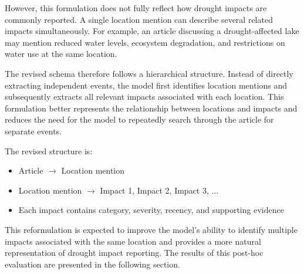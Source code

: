 However, this formulation does not fully reflect how drought impacts are commonly reported. A single location mention can describe several related impacts simultaneously. For example, an article discussing a drought-affected lake may mention reduced water levels, ecosystem degradation, and restrictions on water use at the same location.

The revised schema therefore follows a hierarchical structure. Instead of directly extracting independent events, the model first identifies location mentions and subsequently extracts all relevant impacts associated with each location. This formulation better represents the relationship between locations and impacts and reduces the need for the model to repeatedly search through the article for separate events.

The revised structure is:

\begin{itemize}
\item Article $\rightarrow$ Location mention
\item Location mention $\rightarrow$ Impact 1, Impact 2, Impact 3, ...
\item Each impact contains category, severity, recency, and supporting evidence
\end{itemize}

This reformulation is expected to improve the model's ability to identify multiple impacts associated with the same location and provides a more natural representation of drought impact reporting. The results of this post-hoc evaluation are presented in the following section.



